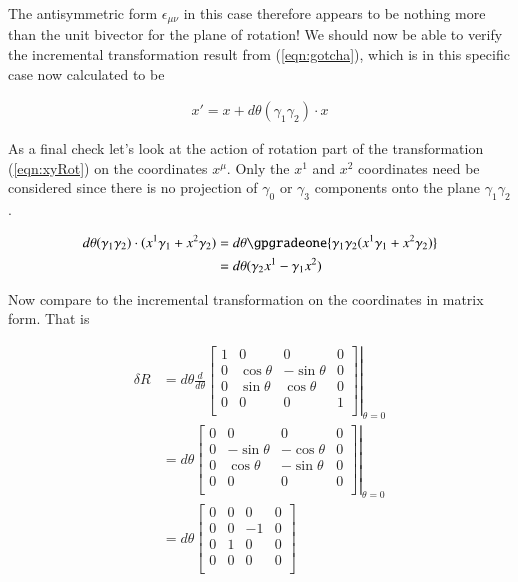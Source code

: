 The antisymmetric form $\epsilon_{\mu\nu}$ in this case therefore appears to be nothing more than the unit bivector for the plane of rotation!  We should now be able to verify
the incremental transformation result from (\ref{eqn:gotcha}), which is in this specific case now calculated to be

\begin{align}\label{eqn:xyRot}
x'= x + d\theta (\gamma_1 \gamma_2) \cdot x
\end{align}

As a final check let's look at the action of rotation part of the transformation (\ref{eqn:xyRot}) on the coordinates $x^\mu$.  Only the $x^1$ and $x^2$ coordinates need be considered since there is no projection of $\gamma_0$ or $\gamma_3$ components onto the plane $\gamma_1 \gamma_2$.

\begin{align*}
d\theta (\gamma_1 \gamma_2) \cdot (x^1 \gamma_1 + x^2 \gamma_2)
&= 
d\theta \gpgradeone{ \gamma_1 \gamma_2 (x^1 \gamma_1 + x^2 \gamma_2) } \\
&= 
d\theta (\gamma_2 x^1 - \gamma_1 x^2)  \\
\end{align*}

Now compare to the incremental transformation on the coordinates in matrix form.  That is

\begin{align*}
\delta R
&=
d\theta \frac{d}{d\theta}
{
\left.
\begin{bmatrix}
1 & 0 & 0 & 0 \\
0 & \cos\theta & -\sin\theta & 0 \\
0 & \sin\theta & \cos\theta & 0 \\
0 & 0 & 0 & 1 \\
\end{bmatrix}
\right\vert}_{\theta=0} \\
&=
d\theta
{
\left.
\begin{bmatrix}
0 & 0 & 0 & 0 \\
0 & -\sin\theta & -\cos\theta & 0 \\
0 & \cos\theta & -\sin\theta & 0 \\
0 & 0 & 0 & 0 \\
\end{bmatrix}
\right\vert}_{\theta=0} \\
&=
d\theta
\begin{bmatrix}
0 & 0 & 0 & 0 \\
0 & 0 & -1 & 0 \\
0 & 1 & 0 & 0 \\
0 & 0 & 0 & 0 \\
\end{bmatrix} \\
\end{align*}


